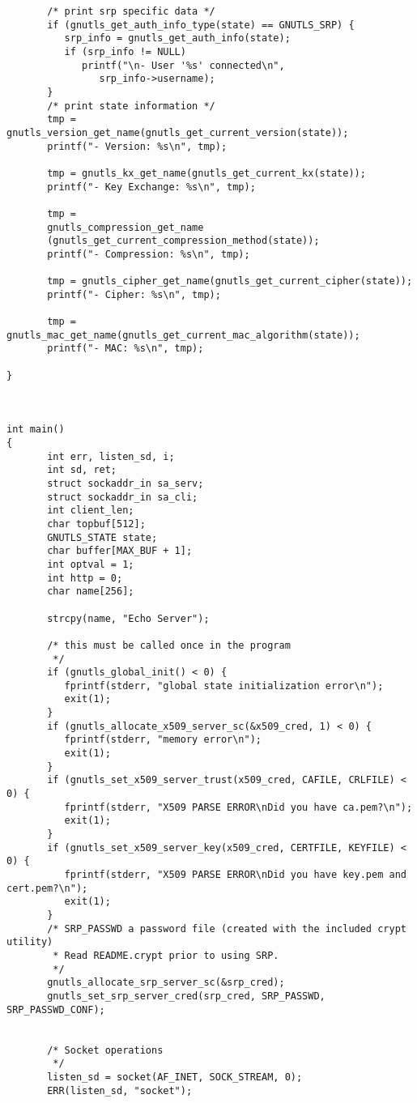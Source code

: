 \begin{verbatim}
       /* print srp specific data */
       if (gnutls_get_auth_info_type(state) == GNUTLS_SRP) {
	      srp_info = gnutls_get_auth_info(state);
	      if (srp_info != NULL)
		     printf("\n- User '%s' connected\n",
			    srp_info->username);
       }
       /* print state information */
       tmp = gnutls_version_get_name(gnutls_get_current_version(state));
       printf("- Version: %s\n", tmp);

       tmp = gnutls_kx_get_name(gnutls_get_current_kx(state));
       printf("- Key Exchange: %s\n", tmp);

       tmp =
	   gnutls_compression_get_name
	   (gnutls_get_current_compression_method(state));
       printf("- Compression: %s\n", tmp);

       tmp = gnutls_cipher_get_name(gnutls_get_current_cipher(state));
       printf("- Cipher: %s\n", tmp);

       tmp = gnutls_mac_get_name(gnutls_get_current_mac_algorithm(state));
       printf("- MAC: %s\n", tmp);

}



int main()
{
       int err, listen_sd, i;
       int sd, ret;
       struct sockaddr_in sa_serv;
       struct sockaddr_in sa_cli;
       int client_len;
       char topbuf[512];
       GNUTLS_STATE state;
       char buffer[MAX_BUF + 1];
       int optval = 1;
       int http = 0;
       char name[256];

       strcpy(name, "Echo Server");

       /* this must be called once in the program
        */
       if (gnutls_global_init() < 0) {
	      fprintf(stderr, "global state initialization error\n");
	      exit(1);
       }
       if (gnutls_allocate_x509_server_sc(&x509_cred, 1) < 0) {
	      fprintf(stderr, "memory error\n");
	      exit(1);
       }
       if (gnutls_set_x509_server_trust(x509_cred, CAFILE, CRLFILE) < 0) {
	      fprintf(stderr, "X509 PARSE ERROR\nDid you have ca.pem?\n");
	      exit(1);
       }
       if (gnutls_set_x509_server_key(x509_cred, CERTFILE, KEYFILE) < 0) {
	      fprintf(stderr, "X509 PARSE ERROR\nDid you have key.pem and cert.pem?\n");
	      exit(1);
       }
       /* SRP_PASSWD a password file (created with the included crypt utility) 
        * Read README.crypt prior to using SRP.
        */
       gnutls_allocate_srp_server_sc(&srp_cred);
       gnutls_set_srp_server_cred(srp_cred, SRP_PASSWD, SRP_PASSWD_CONF);


       /* Socket operations
        */
       listen_sd = socket(AF_INET, SOCK_STREAM, 0);
       ERR(listen_sd, "socket");


\end{verbatim}
